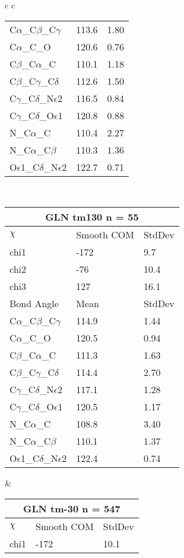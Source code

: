 \begin{longtable}{ c c }
\begin{tabular}{ l l l }
  C$\alpha$\_C$\beta$\_C$\gamma$ & 113.6 & 1.80\\
  C$\alpha$\_C\_O & 120.6 & 0.76\\
  C$\beta$\_C$\alpha$\_C & 110.1 & 1.18\\
  C$\beta$\_C$\gamma$\_C$\delta$ & 112.6 & 1.50\\
  C$\gamma$\_C$\delta$\_N$\epsilon$2 & 116.5 & 0.84\\
  C$\gamma$\_C$\delta$\_O$\epsilon$1 & 120.8 & 0.88\\
  N\_C$\alpha$\_C & 110.4 & 2.27\\
  N\_C$\alpha$\_C$\beta$ & 110.3 & 1.36\\
  O$\epsilon$1\_C$\delta$\_N$\epsilon$2 & 122.7 & 0.71\\
  \bottomrule
  \end{tabular}
  \\
  \begin{tabular}{ l l l }
  \toprule
  \multicolumn{3}{c}{GLN \textbf{tm130} n = 55} \\ \toprule
  $\chi$       & Smooth COM & StdDev \\ \midrule
  chi1 & -172 & 9.7 \\ 
  chi2 & -76 & 10.4 \\ 
  chi3 & 127 & 16.1 \\ \midrule
  Bond Angle   & Mean     & StdDev \\ \midrule
  C$\alpha$\_C$\beta$\_C$\gamma$ & 114.9 & 1.44\\
  C$\alpha$\_C\_O & 120.5 & 0.94\\
  C$\beta$\_C$\alpha$\_C & 111.3 & 1.63\\
  C$\beta$\_C$\gamma$\_C$\delta$ & 114.4 & 2.70\\
  C$\gamma$\_C$\delta$\_N$\epsilon$2 & 117.1 & 1.28\\
  C$\gamma$\_C$\delta$\_O$\epsilon$1 & 120.5 & 1.17\\
  N\_C$\alpha$\_C & 108.8 & 3.40\\
  N\_C$\alpha$\_C$\beta$ & 110.1 & 1.37\\
  O$\epsilon$1\_C$\delta$\_N$\epsilon$2 & 122.4 & 0.74\\
  \bottomrule
  \end{tabular}
  &
  \begin{tabular}{ l l l }
  \toprule
  \multicolumn{3}{c}{GLN \textbf{tm-30} n = 547} \\ \toprule
  $\chi$       & Smooth COM & StdDev \\ \midrule
  chi1 & -172 & 10.1 \\ 

\end{tabular}
\end{longtable}
